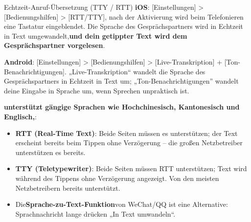 \begin{tcbinfo}{Echtzeit-Anruf-Übersetzung (TTY / RTT)}
\textbf{iOS}: [Einstellungen] > [Bedienungshilfen] > [RTT/TTY], nach der Aktivierung wird beim Telefonieren eine Tastatur eingeblendet. Die Sprache des Gesprächspartners wird in Echtzeit in Text umgewandelt,\textbf{und dein getippter Text wird dem Gesprächspartner vorgelesen}.

\textbf{Android}: [Einstellungen] > [Bedienungshilfen] > [Live-Transkription] + [Ton-Benachrichtigungen]. „Live-Transkription“ wandelt die Sprache des Gesprächspartners in Echtzeit in Text um; „Ton-Benachrichtigungen” wandelt deine Eingabe in Sprache um, wenn Sprechen unpraktisch ist.

\textbf{unterstützt gängige Sprachen wie Hochchinesisch, Kantonesisch und Englisch,}:

\begin{itemize}
  \item \textbf{RTT (Real-Time Text)}: Beide Seiten müssen es unterstützen; der Text erscheint bereits beim Tippen ohne Verzögerung – die großen Netzbetreiber unterstützen es bereits.
  \item \textbf{TTY (Teletypewriter)}: Beide Seiten müssen RTT unterstützen; Text wird während des Tippens ohne Verzögerung angezeigt. Von den meisten Netzbetreibern bereits unterstützt.
  \item Die\textbf{Sprache-zu-Text-Funktion}von WeChat/QQ ist eine Alternative: Sprachnachricht lange drücken „In Text umwandeln“.
\end{itemize}

\end{tcbinfo}


